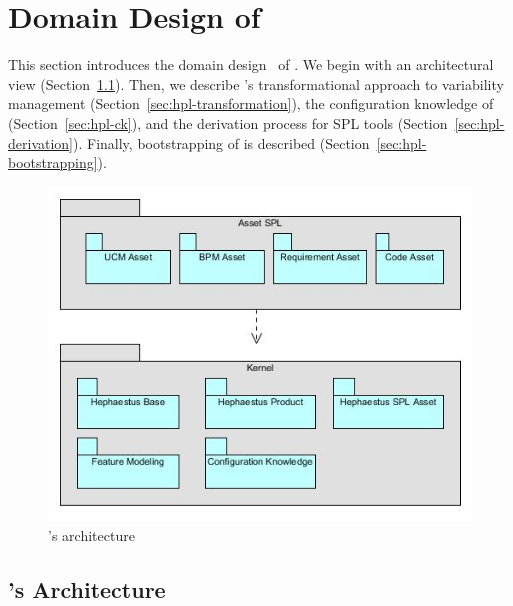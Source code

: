 
\section{Domain Design of \hpl}
\label{sec:domainDesign}

This section introduces the domain design~\cite{gpbook} of \hpl. We begin with an architectural view (Section~\ref{sec:hpl-architecture}). Then, we describe \hpl's transformational approach to variability management (Section~\ref{sec:hpl-transformation}), the configuration knowledge of \hpl{} (Section~\ref{sec:hpl-ck}), and the derivation process for SPL tools (Section~\ref{sec:hpl-derivation}).  Finally, bootstrapping of \hpl{} is described (Section~\ref{sec:hpl-bootstrapping}).


\begin{figure}[t!]
\begin{center}
\includegraphics[width=.9\textwidth]{imagens/architecture-hpl-vf.jpg}
\end{center}
\caption{\hpl's architecture}
\label{fig:hpl-architecture}
\end{figure}


\subsection{\hpl's Architecture} 
\label{sec:hpl-architecture}

